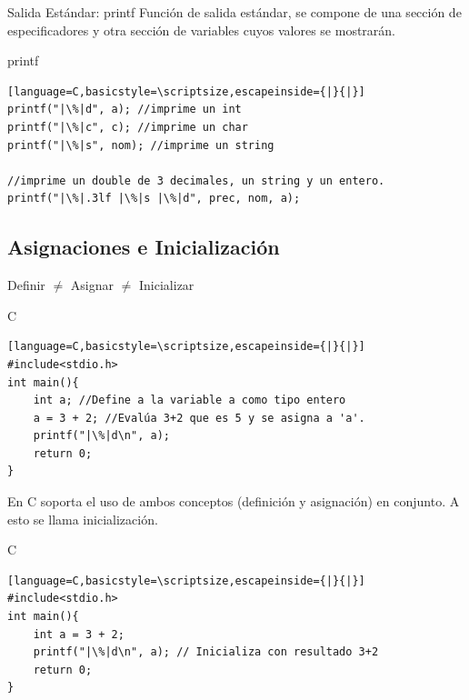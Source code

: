 \documentclass{beamer}
\begin{document}
\begin{frame}[fragile]{Salida Estándar: printf}
Función de salida estándar, se compone de una sección de especificadores y otra sección de variables cuyos valores se mostrarán.

\begin{exampleblock}{printf}
\begin{lstlisting}[language=C,basicstyle=\scriptsize,escapeinside={|}{|}]
printf("|\%|d", a); //imprime un int
printf("|\%|c", c); //imprime un char
printf("|\%|s", nom); //imprime un string

//imprime un double de 3 decimales, un string y un entero.
printf("|\%|.3lf |\%|s |\%|d", prec, nom, a); 
\end{lstlisting}
\end{exampleblock}

\end{frame}


\subsection{Asignaciones e Inicialización}
\begin{frame}[fragile]{Definir $\neq$ Asignar $\neq$ Inicializar}
\begin{exampleblock}{C}
	\begin{lstlisting}[language=C,basicstyle=\scriptsize,escapeinside={|}{|}]
#include<stdio.h>
int main(){
	int a; //Define a la variable a como tipo entero
	a = 3 + 2; //Evalúa 3+2 que es 5 y se asigna a 'a'. 
	printf("|\%|d\n", a);
	return 0;
}
	\end{lstlisting}
\end{exampleblock}
{\small En C soporta el uso de ambos conceptos (definición y asignación) en conjunto. A esto se llama inicialización.}
\begin{exampleblock}{C}
	\begin{lstlisting}[language=C,basicstyle=\scriptsize,escapeinside={|}{|}]
#include<stdio.h>
int main(){
	int a = 3 + 2; 
	printf("|\%|d\n", a); // Inicializa con resultado 3+2
	return 0;
}
	\end{lstlisting}
\end{exampleblock}

\end{frame}
\end{document}
